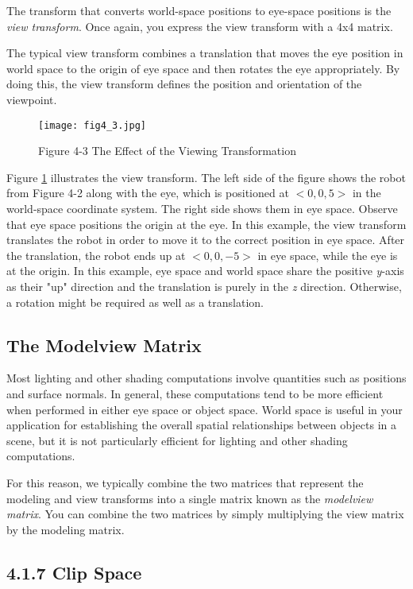 \documentclass[../main.tex]{subfiles}
\begin{document}
The transform that converts world-space positions to eye-space positions is the \textit{view transform}. Once again, you express the view transform with a 4x4 matrix.

The typical view transform combines a translation that moves the eye position in world space to the origin of eye space and then rotates the eye appropriately. By doing this, the view transform defines the position and orientation of the viewpoint.

\begin{figure}
    \centering
    \texttt{[image: fig4\_3.jpg]}
    \caption{Figure 4-3 The Effect of the Viewing Transformation}
    \label{fig:4-3}
\end{figure}

Figure \ref{fig:4-3} illustrates the view transform. The left side of the figure shows the robot from Figure 4-2 along with the eye, which is positioned at $<0, 0, 5>$ in the world-space coordinate system. The right side shows them in eye space. Observe that eye space positions the origin at the eye. In this example, the view transform translates the robot in order to move it to the correct position in eye space. After the translation, the robot ends up at $<0, 0, -5>$ in eye space, while the eye is at the origin. In this example, eye space and world space share the positive \textit{y}-axis as their "up" direction and the translation is purely in the \textit{z} direction. Otherwise, a rotation might be required as well as a translation.

\subsection*{The Modelview Matrix}

Most lighting and other shading computations involve quantities such as positions and surface normals. In general, these computations tend to be more efficient when performed in either eye space or object space. World space is useful in your application for establishing the overall spatial relationships between objects in a scene, but it is not particularly efficient for lighting and other shading computations.

For this reason, we typically combine the two matrices that represent the modeling and view transforms into a single matrix known as the \textit{modelview matrix}. You can combine the two matrices by simply multiplying the view matrix by the modeling matrix.

\subsection{4.1.7 Clip Space}
\end{document}
